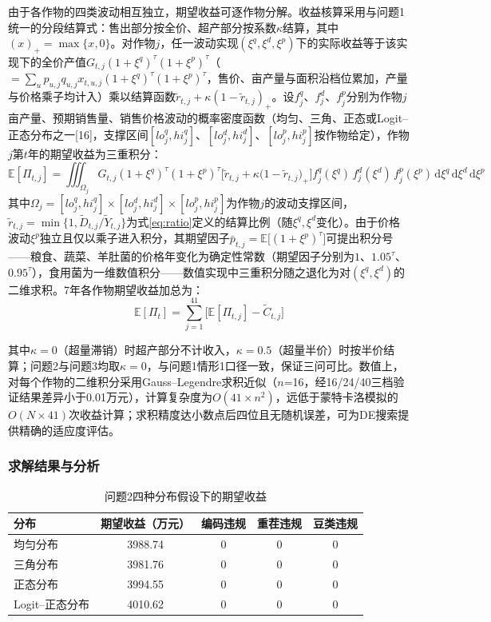 \documentclass[12pt,a4paper]{article}
\begin{document}
由于各作物的四类波动相互独立，期望收益可逐作物分解。收益核算采用与问题1统一的分段结算式：售出部分按全价、超产部分按系数$\kappa$结算，其中$(x)_+=\max\{x,0\}$。对作物$j$，任一波动实现$(\xi^q,\xi^d,\xi^p)$下的实际收益等于该实现下的全价产值$G_{t,j}(1+\xi^q)^{\tau}(1+\xi^p)^{\tau}$（$=\sum_up_{u,j}q_{u,j}x_{t,u,j}(1+\xi^q)^{\tau}(1+\xi^p)^{\tau}$，售价、亩产量与面积沿档位累加，产量与价格乘子均计入）乘以结算函数$\tilde r_{t,j}+\kappa(1-\tilde r_{t,j})_+$。设$f^q_j$、$f^d_j$、$f^p_j$分别为作物$j$亩产量、预期销售量、销售价格波动的概率密度函数（均匀、三角、正态或Logit--正态分布之一[16]，支撑区间$[lo^q_j,hi^q_j]$、$[lo^d_j,hi^d_j]$、$[lo^p_j,hi^p_j]$按作物给定），作物$j$第$t$年的期望收益为三重积分：
\begin{equation}
\mathbb{E}[\Pi_{t,j}]=\iiint_{\Omega_j}G_{t,j}(1+\xi^q)^{\tau}(1+\xi^p)^{\tau}\Big[\tilde r_{t,j}+\kappa\big(1-\tilde r_{t,j}\big)_+\Big]f^q_j(\xi^q)\,f^d_j(\xi^d)\,f^p_j(\xi^p)\,\mathrm{d}\xi^q\,\mathrm{d}\xi^d\,\mathrm{d}\xi^p
\label{eq:expectj}
\end{equation}
其中$\Omega_j=[lo^q_j,hi^q_j]\times[lo^d_j,hi^d_j]\times[lo^p_j,hi^p_j]$为作物$j$的波动支撑区间，$\tilde r_{t,j}=\min\{1,\tilde D_{t,j}/\tilde Y_{t,j}\}$为式\eqref{eq:ratio}定义的结算比例（随$\xi^q,\xi^d$变化）。由于价格波动$\xi^p$独立且仅以乘子进入积分，其期望因子$\bar p_{t,j}=\mathbb{E}\big[(1+\xi^p)^{\tau}\big]$可提出积分号——粮食、蔬菜、羊肚菌的价格年变化为确定性常数（期望因子分别为$1$、$1.05^{\tau}$、$0.95^{\tau}$），食用菌为一维数值积分——数值实现中三重积分随之退化为对$(\xi^q,\xi^d)$的二维求积。7年各作物期望收益加总为：
\begin{equation}
\mathbb{E}[\Pi_t]=\sum_{j=1}^{41}\Big[\mathbb{E}[\Pi_{t,j}]-\tilde C_{t,j}\Big]
\label{eq:expect}
\end{equation}

其中$\kappa=0$（超量滞销）时超产部分不计收入，$\kappa=0.5$（超量半价）时按半价结算；问题2与问题3均取$\kappa=0$，与问题1情形1口径一致，保证三问可比。数值上，对每个作物的二维积分采用Gauss--Legendre求积近似（$n$=16，经16/24/40三档验证结果差异小于0.01万元），计算复杂度为$O(41\times n^2)$，远低于蒙特卡洛模拟的$O(N\times41)$次收益计算；求积精度达小数点后四位且无随机误差，可为DE搜索提供精确的适应度评估。

\subsubsection{求解结果与分析}

\begin{table}[H]
\centering
\caption{问题2四种分布假设下的期望收益}
\label{tab:q2}
\begin{tabular}{lcccc}
\toprule
分布 & 期望收益（万元） & 编码违规 & 重茬违规 & 豆类违规 \\
\midrule
均匀分布 & 3988.74 & 0 & 0 & 0 \\
三角分布 & 3981.76 & 0 & 0 & 0 \\
正态分布 & 3994.55 & 0 & 0 & 0 \\
Logit--正态分布 & 4010.62 & 0 & 0 & 0 \\
\bottomrule
\end{tabular}
\end{table}
\end{document}
